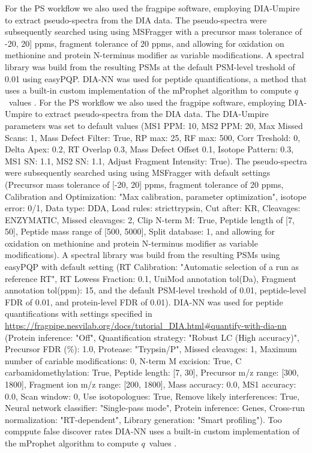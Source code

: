 \documentclass[10pt,letterpaper]{article}
\begin{document}
For the PS workflow we also used the fragpipe software, employing DIA-Umpire to extract pseudo-spectra from the DIA data. The pseudo-spectra were subsequently searched using using MSFragger with a precursor mass tolerance of -20, 20] ppms, fragment tolerance of 20 ppms, and allowing for oxidation on methionine and protein N-terminus modifier as variable modifications.  A spectral library was build from the resulting PSMs at the default PSM-level treshold of 0.01 using easyPQP. DIA-NN was used for peptide quantifications, a method that uses a built-in custom implementation of the mProphet algorithm to compute $q$~values \cite{reiter2011mprophet, demichev2020dia}.
For the PS workflow we also used the fragpipe software, employing DIA-Umpire to extract pseudo-spectra from the DIA data. The DIA-Umpire parameters was set to default values (MS1 PPM: 10, MS2 PPM: 20, Max Missed Scans: 1, Mass Defect Filter: True, RP max: 25, RF max: 500, Corr Treshold: 0, Delta Apex: 0.2, RT Overlap 0.3, Mass Defect Offset 0.1, Isotope Pattern: 0.3, MS1 SN: 1.1, MS2 SN: 1.1, Adjust Fragment Intensity: True). The pseudo-spectra were subsequently searched using using MSFragger with default settings (Precursor mass tolerance of [-20, 20] ppms, fragment tolerance of 20 ppms, Calibration and Optimization: "Max calibration, parameter optimization", isotope error: 0/1, Data type: DDA, Load rules: stricttrypsin, Cut after: KR, Cleavages: ENZYMATIC, Missed cleavages: 2, Clip N-term M: True, Peptide length of [7, 50], Peptide mass range of [500, 5000], Split database: 1, and allowing for oxidation on methionine and protein N-terminus modifier as variable modifications).  A spectral library was build from the resulting PSMs using easyPQP with default setting (RT Calibration: "Automatic selection of a run as reference RT", RT Lowess Fraction: 0.1, UniMod annotation tol(Da), Fragment annotation tol(ppm): 15, and the default PSM-level treshold of 0.01, peptide-level FDR of 0.01, and protein-level FDR of 0.01). DIA-NN was used for peptide quantifications with settings specified in \url{https://fragpipe.nesvilab.org/docs/tutorial_DIA.html#quantify-with-dia-nn} (Protein inference: "Off", Quantification strategy: "Robust LC (High accuracy)", Precursor FDR (\%): 1.0, Protease: "Trypsin/P", Missed cleavages: 1, Maximum number of cariable modifications: 0, N-term M excision: True, C carbamidomethylation: True, Peptide length: [7, 30], Precursor m/z range: [300, 1800], Fragment ion m/z range: [200, 1800], Mass accuracy: 0.0, MS1 accuracy: 0.0, Scan window: 0, Use isotopologues: True, Remove likely interferences: True, Neural network classifier: "Single-pass mode", Protein inference: Genes, Cross-run normalization: "RT-dependent", Library generation: "Smart profiling"). Too comppute false discover rates DIA-NN uses a built-in custom implementation of the mProphet algorithm to compute $q$~values \cite{reiter2011mprophet, demichev2020dia}.
 
\end{document}
